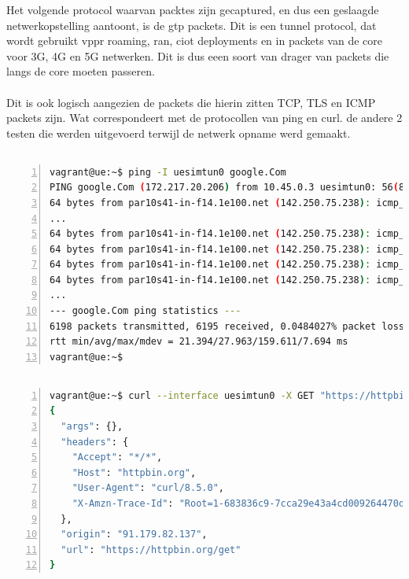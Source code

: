 Het volgende protocol waarvan packtes zijn gecaptured, en dus een geslaagde netwerkopstelling aantoont, is de \gls{gtp} packets.
Dit is een tunnel protocol, dat wordt gebruikt vppr roaming, \gls{ran}, \gls{ciot} deployments en in packets van de core voor 3G, 4G en 5G netwerken. \autocite{palo2022} Dit is dus eeen soort van drager van packets die langs de core moeten passeren.\\\\
Dit is ook logisch aangezien de packets die hierin zitten TCP, TLS en ICMP packets zijn. Wat correspondeert met de protocollen van ping en curl. de andere 2 testen die werden uitgevoerd terwijl de netwerk opname werd gemaakt.
\subsection{}%
\label{sec:Test-ping}%

\begin{lstlisting}[basicstyle=\small, frame=single, breaklines=true, postbreak=\mbox{\textcolor{red}{$\hookrightarrow$}\space}, escapeinside ={\%,}, escapechar={!}, numbers=left, language=sh, caption=Test - Ping]
    vagrant@ue:~$ ping -I uesimtun0 google.Com
PING google.Com (172.217.20.206) from 10.45.0.3 uesimtun0: 56(84) bytes of data.
64 bytes from par10s41-in-f14.1e100.net (142.250.75.238): icmp_seq=6182 ttl=116 time=25.1 ms
...
64 bytes from par10s41-in-f14.1e100.net (142.250.75.238): icmp_seq=6183 ttl=116 time=41.6 ms
64 bytes from par10s41-in-f14.1e100.net (142.250.75.238): icmp_seq=6184 ttl=116 time=30.3 ms
64 bytes from par10s41-in-f14.1e100.net (142.250.75.238): icmp_seq=6185 ttl=116 time=38.5 ms
64 bytes from par10s41-in-f14.1e100.net (142.250.75.238): icmp_seq=6186 ttl=116 time=23.5 ms
...
--- google.Com ping statistics ---
6198 packets transmitted, 6195 received, 0.0484027% packet loss, time 6231019ms
rtt min/avg/max/mdev = 21.394/27.963/159.611/7.694 ms
vagrant@ue:~$
\end{lstlisting}

\subsection{}%
\label{sec:Test-curl}%


\begin{lstlisting}[basicstyle=\small, frame=single, breaklines=true, postbreak=\mbox{\textcolor{red}{$\hookrightarrow$}\space}, escapeinside ={\%,}, escapechar={!}, numbers=left, language=sh, caption=Test - Curl]
vagrant@ue:~$ curl --interface uesimtun0 -X GET "https://httpbin.org/get"
{
  "args": {},
  "headers": {
    "Accept": "*/*",
    "Host": "httpbin.org",
    "User-Agent": "curl/8.5.0",
    "X-Amzn-Trace-Id": "Root=1-683836c9-7cca29e43a4cd009264470d9"
  },
  "origin": "91.179.82.137",
  "url": "https://httpbin.org/get"
}
\end{lstlisting}

